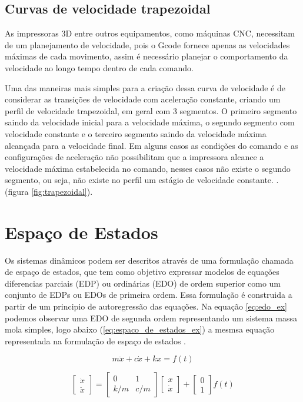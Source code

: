 \subsection{Curvas de velocidade trapezoidal}
As impressoras 3D entre outros equipamentos, como máquinas CNC, necessitam
de um planejamento de velocidade, pois o Gcode fornece apenas as velocidades máximas
de cada movimento, assim é necessário planejar o comportamento da velocidade ao longo tempo
dentro de cada comando.

Uma das maneiras mais simples para a criação dessa curva de velocidade é
de considerar as transições de velocidade com aceleração constante, criando 
um perfil de velocidade trapezoidal, em geral com 3 segmentos.
O primeiro segmento saindo da velocidade inicial para a velocidade máxima,
o segundo segmento com velocidade constante e o terceiro segmento saindo da velocidade máxima alcançada
para a velocidade final.
Em alguns casos as condições do comando e as configurações de aceleração não possibilitam que a impressora
alcance a velocidade máxima estabelecida no comando, nesses casos não existe o segundo segmento, ou seja, não existe
no perfil um estágio de velocidade constante.
\cite{yu20,klipperkinematic}.
(figura \ref{fig:trapezoidal}).

\section{Espaço de Estados}

Os sistemas dinâmicos podem ser descritos através de uma formulação
chamada de espaço de estados, que tem como objetivo expressar modelos 
de equações diferencias parciais (EDP) ou ordinárias (EDO) de ordem superior
como um conjunto de EDPs ou EDOs de primeira ordem.
Essa formulação é construida a partir de um principio de autoregressão
das equações. Na equação \ref{eq:edo_ex} podemos observar uma EDO de segunda ordem representando
um sistema massa mola simples,
logo abaixo (\ref{eq:espaco_de_estados_ex}) a mesmsa equação representada na formulação
de espaço de estados \cite{hamilton94}.

\begin{equation}
    \label{eq:edo_ex}
    m \ddot x+c \dot x+kx = f(t)
\end{equation}

\begin{equation}
    \label{eq:espaco_de_estados_ex}
    \begin{bmatrix}
        \dot x \\
        \ddot x
    \end{bmatrix}
    =
    \begin{bmatrix}
        0 & 1 \\
        k/m & c/m
    \end{bmatrix}
    \begin{bmatrix}
        x \\
        \dot x
    \end{bmatrix}
    +
    \begin{bmatrix}
        0 \\
        1
    \end{bmatrix}
    f(t)
\end{equation}

